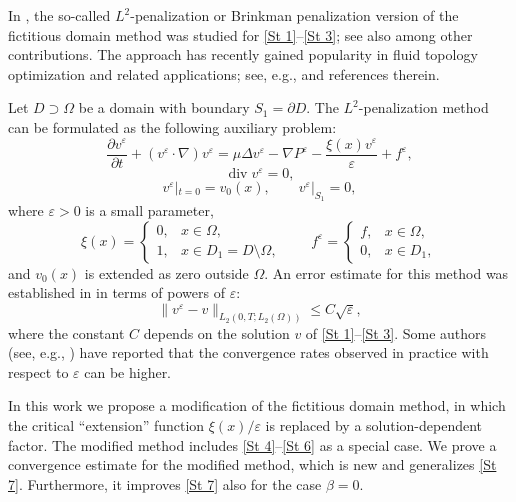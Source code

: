 \documentclass[11pt]{article}
\begin{document}
In \cite{angot1999penalization,carbou2003boundary}, the so-called $L^2$-penalization or Brinkman penalization version of the fictitious domain method was studied for \eqref{St 1}–\eqref{St 3}; {see also \cite{angot1999analysis,kevlahan2001computation,sharaborin2021coupled,kevlahan2005adaptive,liu2007brinkman} among other contributions}. The approach has recently gained popularity in fluid topology optimization and related applications; see, e.g., \cite{abdelhamid2023calculation,boscolo2025scaling} and references therein. 

Let $D \supset \Omega$ be a domain with boundary $S_1 = \partial D$. The $L^2$-penalization method can be formulated as the following auxiliary problem:
\begin{equation}\label{St 4}
	\frac{\partial v^\varepsilon}{\partial t} + (v^\varepsilon \cdot \nabla)v^\varepsilon = \mu\Delta v^\varepsilon - \nabla P^\varepsilon - \frac{\xi(x)v^\varepsilon}{\varepsilon} + f^\varepsilon,
\end{equation}
\begin{equation} \label{St 5}
	\operatorname{div} v^\varepsilon = 0,
\end{equation}
\begin{equation}\label{St 6}
	v^\varepsilon|_{t=0} = v_0(x),\qquad v^\varepsilon|_{S_1} = 0,
\end{equation}
where $\varepsilon > 0$ is a small parameter, 
\[
\xi(x) = \begin{cases} 
	0, & x \in \Omega, \\[4pt]
	1, & x \in D_1 = D \setminus \Omega, 
\end{cases}
\qquad 
f^{\varepsilon} = \begin{cases} 
	f, & x \in \Omega, \\[4pt]
	0, & x \in D_1,
\end{cases}
\]
and $v_0(x)$ is extended as zero outside $\Omega$. An error estimate for this method was established in \cite{angot1999penalization,carbou2003boundary} in terms of powers of $\varepsilon$:
\begin{equation}\label{St 7}
	\| v^\varepsilon - v \|_{L_2(0,T;L_2(\Omega))} \leq C\sqrt{\varepsilon},
\end{equation}
where the constant $C$ depends on the solution $v$ of \eqref{St 1}--\eqref{St 3}. {Some authors (see, e.g., \cite{kevlahan2005adaptive,sharaborin2021coupled}) have reported that the convergence rates observed in practice with respect to $\varepsilon$ can be higher.} 

In this work we propose a modification of the fictitious domain method, in which the critical ``extension'' function $\xi(x)/\varepsilon$ is replaced by a solution-dependent factor. The modified method includes \eqref{St 4}--\eqref{St 6} as a special case. We prove a convergence estimate for the modified method, which is new and  generalizes \eqref{St 7}. Furthermore, it improves \eqref{St 7} also for the case $\beta=0$.
\end{document}
